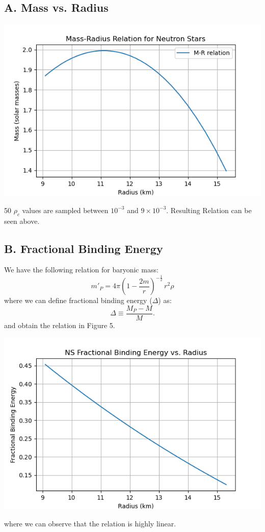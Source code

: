 \documentclass{article}
\begin{document}
\subsection*{A. Mass vs. Radius}

\begin{center}
    \includegraphics[scale=0.65]{images_einstein/e1_mass_vs_radius.png}
\end{center}
50 $\rho_c$ values are sampled between $10^{-3}$ and $9 \times10^{-3}$. Resulting Relation can be seen above.

\subsection*{B. Fractional Binding Energy}
We have the following relation for baryonic mass:
\begin{equation}
    m'_P = 4\pi \left(1 - \frac{2m}{r}\right)^{-\frac{1}{2}} \, r^2 \rho
\end{equation}
where we can define fractional binding energy ($\Delta$) as:
\begin{equation}
    \Delta \equiv \frac{M_P - M}{M}.
\end{equation}
and obtain the relation in Figure 5.
\begin{center}
    \includegraphics[scale=0.65]{images_einstein/e2_frac_binding_energy.png}
\end{center}
where we can observe that the relation is highly linear.
\end{document}
